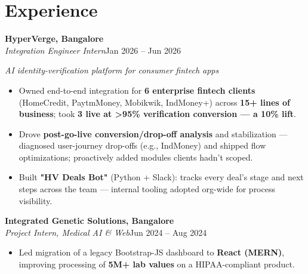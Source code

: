 \documentclass[10pt,a4paper]{article}
\begin{document}
\section*{Experience}
\vspace{1pt}\textbf{HyperVerge, Bangalore}\\
\textit{Integration Engineer Intern}\hfill Jan 2026 -- Jun 2026\par\vspace{1pt}
{\small\itshape AI identity-verification platform for consumer fintech apps}\par\vspace{1pt}
\begin{itemize}
\item Owned end-to-end integration for \textbf{6 enterprise fintech clients} (HomeCredit, PaytmMoney, Mobikwik, IndMoney+) across \textbf{15+ lines of business}; took \textbf{3 live at \textgreater{}95\% verification conversion --- a 10\% lift}.
\item Drove \textbf{post-go-live conversion/drop-off analysis} and stabilization --- diagnosed user-journey drop-offs (e.g., IndMoney) and shipped flow optimizations; proactively added modules clients hadn't scoped.
\item Built \textbf{"HV Deals Bot"} (Python + Slack): tracks every deal's stage and next steps across the team --- internal tooling adopted org-wide for process visibility.
\end{itemize}
\vspace{1pt}\textbf{Integrated Genetic Solutions, Bangalore}\\
\textit{Project Intern, Medical AI \& Web}\hfill Jun 2024 -- Aug 2024\par\vspace{1pt}
\begin{itemize}
\item Led migration of a legacy Bootstrap-JS dashboard to \textbf{React (MERN)}, improving processing of \textbf{5M+ lab values} on a HIPAA-compliant product.
\end{itemize}
\end{document}
